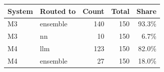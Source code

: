 \begin{tabular}{llrrr}
\toprule
System & Routed to & Count & Total & Share \\
\midrule
M3 & ensemble & 140 & 150 & 93.3\% \\
M3 & nn & 10 & 150 & 6.7\% \\
M4 & llm & 123 & 150 & 82.0\% \\
M4 & ensemble & 27 & 150 & 18.0\% \\
\bottomrule
\end{tabular}
